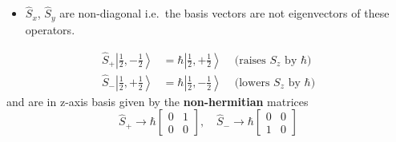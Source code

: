 \begin{itemize}
    \item $\widehat{S}_{x}$, $\widehat{S}_{y}$ are non-diagonal i.e.\ the basis vectors are not eigenvectors of these operators.
\end{itemize}

\begin{align*}
    \widehat{S}_{+}\left|\frac{1}{2},-\frac{1}{2}\right> & =\hbar\left|\frac{1}{2},+\frac{1}{2}\right> & \text{ (raises $S_z$ by $\hbar$)} \\
    \widehat{S}_{-}\left|\frac{1}{2},+\frac{1}{2}\right> & =\hbar\left|\frac{1}{2},-\frac{1}{2}\right> & \text{ (lowers $S_z$ by $\hbar$)}
\end{align*}
and are in z-axis basis given by the \textbf{non-hermitian} matrices
\begin{equation*}
    \widehat{S}_{+}  \rightarrow \hbar\begin{bmatrix}
        0 & 1 \\
        0 & 0
    \end{bmatrix},\quad
    \widehat{S}_{-}  \rightarrow \hbar\begin{bmatrix}
        0 & 0 \\
        1 & 0
    \end{bmatrix}
\end{equation*}